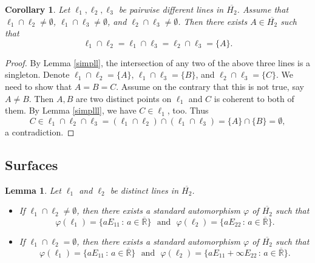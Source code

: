\documentclass[10pt,a4paper]{amsart}
\providecommand{\index}[1]{}
\newcommand\oH{{\overline{H_2}}}
\newcommand\oR{{\overline{\mathbb{R}}}}
\newtheorem{lemma}[theorem]{Lemma}
\newtheorem{corollary}[theorem]{Corollary}
\theoremstyle{definition}
\theoremstyle{remark}
\numberwithin{subsection}{section}
\numberwithin{equation}{section}
\begin{document}
\begin{corollary}\label{triangle}
Let $\ell_1 , \ell_2 , \ell_3$ be pairwise different lines in $\oH$.  Assume that $\ell_1 \cap \ell_2 \not= \emptyset$, 
$\ell_1 \cap \ell_3 \not= \emptyset$,  and $\ell_2 \cap \ell_3 \not= \emptyset$. Then there exists $A \in \oH$ such that
\[
\ell_1 \cap \ell_2 = \ell_1 \cap \ell_3 =\ell_2 \cap \ell_3  = \{ A \}.
\]
\end{corollary}

\begin{proof}
By  Lemma \ref{simpll}, the intersection of any two  of the above three lines is a singleton. Denote $\ell_1 \cap \ell_2 = \{ A \}$,  $\ell_1 \cap \ell_3 = \{ B \}$, and $ \ell_2 \cap \ell_3  = \{ C \}$. We need to show that $A=B=C$. Assume on the contrary that this is not true, say $A\not=B$. Then $A,B$ are two distinct points on $\ell_1$ and $C$ is coherent to both of them. By Lemma \ref{simplll}, we have $C \in \ell_1$, too. 
Thus 
\[
C\in \ell_1\cap \ell_2\cap \ell_3 = (\ell_1\cap \ell_2)\cap (\ell_1 \cap \ell_3)=\{A\}\cap\{B\} = \emptyset,
\]
a contradiction.
\end{proof}


\subsection{Surfaces}\label{ssss}\index{surface}
\begin{lemma}\label{herz}
Let $\ell_1$ and $\ell_2$ be distinct lines in $\oH$.
\begin{itemize}
\item If $\ell_1 \cap \ell_2 \not= \emptyset$, then there exists a standard automorphism $\varphi$ of $\oH$ such that
\[
\varphi ( \ell_1) = \{ a E_{11} \, : \, a \in {\oR} \} \ \ \ \text{and} \ \ \ \varphi ( \ell_2) = \{ a E_{22} \, : \, a \in {\oR} \}.
\]
\item   If $\ell_1 \cap \ell_2 = \emptyset$, then there exists a standard automorphism $\varphi$ of $\oH$ such that
\[
\varphi ( \ell_1) = \{ a E_{11} \, : \, a \in {\oR} \} \ \ \ \text{and} \ \ \ \varphi ( \ell_2) = \{  a E_{11}+\infty E_{22}  \, : \, a \in {\oR} \}.
\]
\end{itemize}
\end{lemma}
\end{document}
